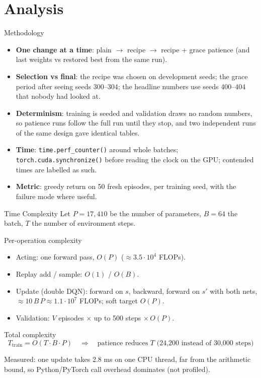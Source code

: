 \documentclass[aspectratio=169]{beamer}
\begin{document}
\section{Analysis}

\begin{frame}{Methodology}
\begin{itemize}
  \item \textbf{One change at a time}: plain $\to$ recipe $\to$ recipe + grace patience (and last weights vs restored best from the same run).
  \item \textbf{Selection vs final}: the recipe was chosen on development seeds; the grace period after seeing seeds 300--304; the headline numbers use seeds 400--404 that nobody had looked at.
  \item \textbf{Determinism}: training is seeded and validation draws no random numbers, so patience runs follow the full run until they stop, and two independent runs of the same design gave identical tables.
  \item \textbf{Time}: \texttt{time.perf\_counter()} around whole batches; \texttt{torch.cuda.synchronize()} before reading the clock on the GPU; contended times are labelled as such.
  \item \textbf{Metric}: greedy return on 50 fresh episodes, per training seed, with the failure mode where useful.
\end{itemize}
\end{frame}

\begin{frame}{Time Complexity}
Let $P=17{,}410$ be the number of parameters, $B=64$ the batch, $T$ the number of environment steps.

\begin{block}{Per-operation complexity}
\begin{itemize}
  \item Acting: one forward pass, $O(P)$ ($\approx 3.5\cdot10^4$ FLOPs).
  \item Replay add / sample: $O(1)$ / $O(B)$.
  \item Update (double DQN): forward on $s$, backward, forward on $s'$ with both nets, $\approx10\,B\,P\approx1.1\cdot10^7$ FLOPs; soft target $O(P)$.
  \item Validation: $V$ episodes $\times$ up to 500 steps $\times\,O(P)$.
\end{itemize}
\end{block}

\begin{block}{Total complexity}
\[
T_{\text{train}}=O(T\cdot B\cdot P)\quad\Rightarrow\quad\text{patience reduces }T\text{ (24{,}200 instead of 30{,}000 steps)}
\]
\end{block}
\small Measured: one update takes 2.8 ms on one CPU thread, far from the arithmetic bound, so Python/PyTorch call overhead dominates (not profiled).
\end{frame}
\end{document}
